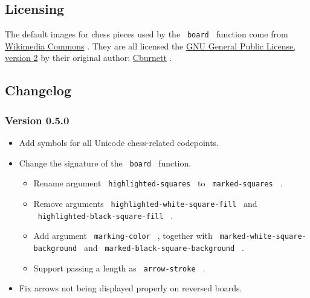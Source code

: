 \pandocbounded{}

\subsection{Licensing}\label{licensing}

The default images for chess pieces used by the \texttt{\ board\ }
function come from
\href{https://commons.wikimedia.org/wiki/Category:SVG_chess_pieces}{Wikimedia
Commons} . They are all licensed the
\href{https://www.gnu.org/licenses/old-licenses/gpl-2.0.html}{GNU
General Public License, version 2} by their original author:
\href{https://en.wikipedia.org/wiki/User:Cburnett}{Cburnett} .

\subsection{Changelog}\label{changelog}

\subsubsection{Version 0.5.0}\label{version-0.5.0}

\begin{itemize}
\item
  Add symbols for all Unicode chess-related codepoints.
\item
  Change the signature of the \texttt{\ board\ } function.

  \begin{itemize}
  \tightlist
  \item
    Rename argument \texttt{\ highlighted-squares\ } to
    \texttt{\ marked-squares\ } .
  \item
    Remove arguments \texttt{\ highlighted-white-square-fill\ } and
    \texttt{\ highlighted-black-square-fill\ } .
  \item
    Add argument \texttt{\ marking-color\ } , together with
    \texttt{\ marked-white-square-background\ } and
    \texttt{\ marked-black-square-background\ } .
  \item
    Support passing a length as \texttt{\ arrow-stroke\ } .
  \end{itemize}
\item
  Fix arrows not being displayed properly on reversed boards.
\end{itemize}

